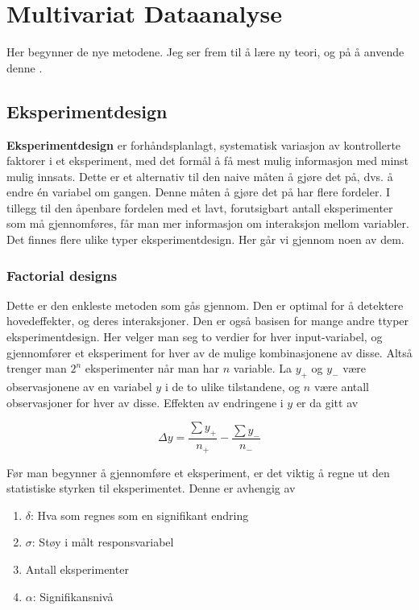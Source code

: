 \section{Multivariat Dataanalyse}
Her begynner de nye metodene. Jeg ser frem til å lære ny teori, og på å anvende denne \Cooley.
 
\subsection{Eksperimentdesign}
\textbf{Eksperimentdesign} er forhåndsplanlagt, systematisk variasjon av kontrollerte faktorer i et eksperiment, med det formål å få mest mulig informasjon med minst mulig innsats. Dette er et alternativ til den naive måten å gjøre det på, dvs. å endre én variabel om gangen. Denne måten å gjøre det på har flere fordeler. I tillegg til den åpenbare fordelen med et lavt, forutsigbart antall eksperimenter som må gjennomføres, får man mer informasjon om interaksjon mellom variabler. Det finnes flere ulike typer eksperimentdesign. Her går vi gjennom noen av dem.

\subsubsection{Factorial designs}
Dette er den enkleste metoden som gås gjennom. Den er optimal for å detektere hovedeffekter, og deres interaksjoner. Den er også basisen for mange andre ttyper eksperimentdesign. Her velger man seg to verdier for hver input-variabel, og gjennomfører et eksperiment for hver av de mulige kombinasjonene av disse. Altså trenger man $2^n$ eksperimenter når man har $n$ variable. La $y_+$ og $y_-$ være observasjonene av en variabel $y$ i de to ulike tilstandene, og $n$ være antall observasjoner for hver av disse. Effekten av endringene i $y$ er da gitt av

\begin{equation}
	\Delta y = \frac{\sum y_+} {n_+} - \frac{\sum y_-}{n_-}
\end{equation}

Før man begynner å gjennomføre et eksperiment, er det viktig å regne ut 
den statistiske styrken til eksperimentet. Denne er avhengig av

\begin{enumerate}
	\item $\delta$: Hva som regnes som en signifikant endring 
	\item $\sigma$: Støy i målt responsvariabel
	\item Antall eksperimenter
	\item $\alpha$: Signifikansnivå
\end{enumerate}

